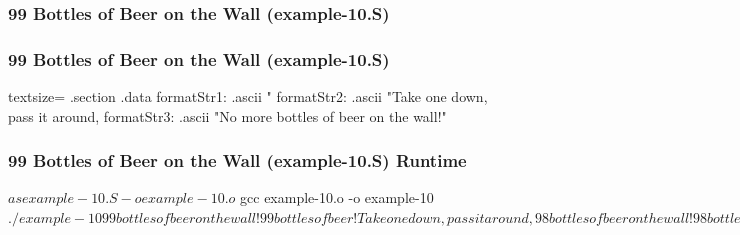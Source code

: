 \documentclass[11pt,xcolor=dvipsnames]{beamer}
\newcommand{\mvs}{\vspace{-0.95em}}
\begin{document}
\begin{frame}[fragile,t]
\mvs
\frametitle{99 Bottles of Beer on the Wall (example-10.S)}
\end{frame}

\begin{frame}[fragile,t]
\mvs
\frametitle{99 Bottles of Beer on the Wall (example-10.S)}
\begin{gascode*}{textsize=}
.section .data
formatStr1:
.ascii "%
formatStr2:
.ascii "Take one down, pass it around, %
formatStr3:
.ascii "No more bottles of beer on the wall!\n\0"
\end{gascode*}
\end{frame}

\begin{frame}[fragile,t]
\mvs
\frametitle{99 Bottles of Beer on the Wall (example-10.S) Runtime}
\begin{textcode}
$ as example-10.S -o example-10.o
$ gcc example-10.o -o example-10
$ ./example-10
99 bottles of beer on the wall! 99 bottles of beer!
Take one down, pass it around, 98 bottles of beer on the wall!
98 bottles of beer on the wall! 98 bottles of beer!
Take one down, pass it around, 97 bottles of beer on the wall!
97 bottles of beer on the wall! 97 bottles of beer!
...
3 bottles of beer on the wall! 3 bottles of beer!
Take one down, pass it around, 2 bottles of beer on the wall!
2 bottles of beer on the wall! 2 bottles of beer!
Take one down, pass it around, 1 bottles of beer on the wall!
1 bottles of beer on the wall! 1 bottles of beer!
Take one down, pass it around, 0 bottles of beer on the wall!
No more bottles of beer on the wall!
$
\end{textcode}
\end{frame}
\end{document}
